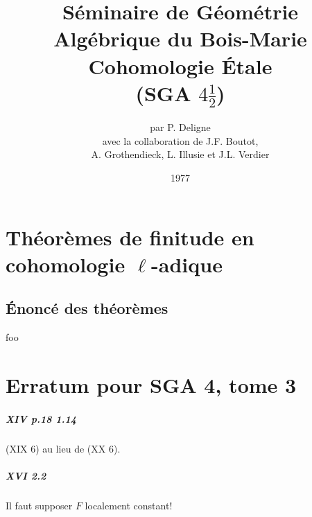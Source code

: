 \documentclass[oneside]{book} %
\title{Séminaire de Géométrie Algébrique du Bois-Marie \\ \vspace{20pt}
Cohomologie Étale \\ \vspace{20pt}
(SGA $4\frac 1 2$)}
\author{par P. Deligne \vspace{10pt}\\ 
avec la collaboration de J.F. Boutot, \\ A. Grothendieck, L. Illusie et J.L. Verdier}
\date{1977}
\begin{document}
\maketitle










\tableofcontents
{} %











\chapter{Théorèmes de finitude en cohomologie \texorpdfstring{$\ell$}{l}-adique}\label{VII}

\section{Énoncé des théorèmes}\label{VII:1}

\begin{theorem_}\label{VII:1-1}
foo
\end{theorem_}











\appendix
\chapter{Erratum pour SGA 4, tome 3}

\paragraph{XIV p.18 1.14}
(XIX 6) au lieu de (XX 6). 

\paragraph{XVI 2.2}
Il faut supposer $F$ localement constant!
\end{document}
